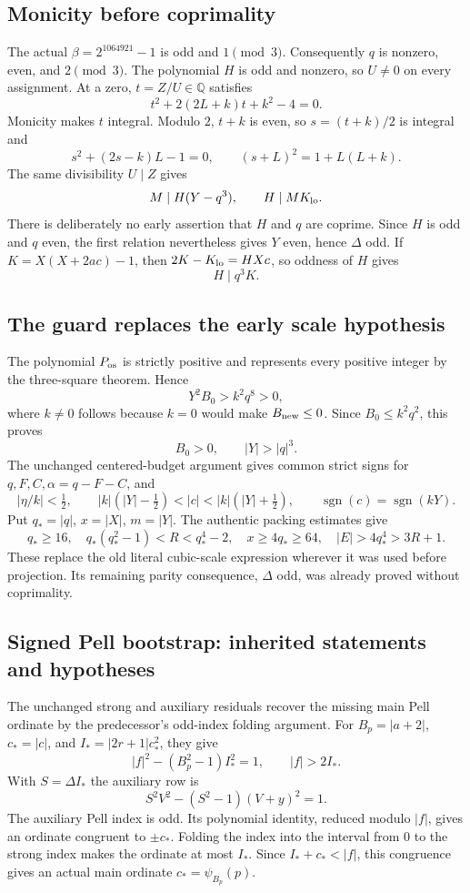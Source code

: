 \subsection{Monicity before coprimality}
The actual $\beta=2^{1064921}-1$ is odd and $1\pmod3$.
Consequently $q$ is nonzero, even, and $2\pmod3$.
The polynomial $H$ is odd and nonzero, so $U\ne0$ on every assignment.
At a zero, $t=Z/U\in\mathbb Q$ satisfies
\[
 t^2+2(2L+k)t+k^2-4=0.
\]
Monicity makes $t$ integral. Modulo $2$, $t+k$ is even, so
$s=(t+k)/2$ is integral and
\[
 s^2+(2s-k)L-1=0,\qquad (s+L)^2=1+L(L+k).
\]
The same divisibility $U\mid Z$ gives
\[
 M\mid H(Y-q^3),\qquad H\mid MK_{\rm lo}.
\]
There is deliberately no early assertion that $H$ and $q$ are coprime.
Since $H$ is odd and $q$ even, the first relation nevertheless gives
$Y$ even, hence $\Delta$ odd. If
$K=X(X+2ac)-1$, then $2K-K_{\rm lo}=HXc$, so oddness of $H$ gives
\[
 H\mid q^3 K.
\]

\subsection{The guard replaces the early scale hypothesis}
The polynomial $P_{\rm os}$ is strictly positive and represents every
positive integer by the three-square theorem. Hence
\[
 Y^2B_0>k^2q^8>0,
\]
where $k\ne0$ follows because $k=0$ would make $B_{\rm new}\le0$.
Since $B_0\le k^2q^2$, this proves
\[
 B_0>0,\qquad |Y|>|q|^3.
\]
The unchanged centered-budget argument gives common strict signs for
$q,F,C,\alpha=q-F-C$, and
\[
 |\eta/k|<\tfrac12,\qquad
 |k|(|Y|-\tfrac12)<|c|<|k|(|Y|+\tfrac12),\qquad
 \operatorname{sgn}(c)=\operatorname{sgn}(kY).
\]
Put $q_*=|q|$, $x=|X|$, $m=|Y|$. The authentic packing estimates give
\[
 q_*\ge16,\quad q_*(q_*^2-1)<R<q_*^4-2,\quad
 x\ge4q_*\ge64,\quad |E|>4q_*^4>3R+1.
\]
These replace the old literal cubic-scale expression wherever it was
used before projection. Its remaining parity consequence, $\Delta$ odd,
was already proved without coprimality.

\subsection{Signed Pell bootstrap: inherited statements and hypotheses}
The unchanged strong and auxiliary residuals recover the missing main
Pell ordinate by the predecessor's odd-index folding argument.
For $B_p=|a+2|$, $c_*=|c|$, and $I_*=|2r+1|c_*^2$, they give
\[
 |f|^2-(B_p^2-1)I_*^2=1,\qquad |f|>2I_*.
\]
With $S=\Delta I_*$ the auxiliary row is
\[
 S^2V^2-(S^2-1)(V+y)^2=1.
\]
The auxiliary Pell index is odd. Its polynomial identity, reduced
modulo $|f|$, gives an ordinate congruent to $\pm c_*$.
Folding the index into the interval from $0$ to the strong index
makes the ordinate at most $I_*$. Since $I_*+c_*<|f|$, this
congruence gives an actual main ordinate $c_*=\psi_{B_p}(p)$.

